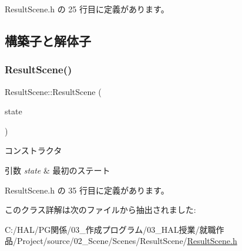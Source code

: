  Result\+Scene.\+h の 25 行目に定義があります。



\subsection{構築子と解体子}
\mbox{\label{class_result_scene_ac184d41a92125eda200a132fe7aadd2e}} 
\subsubsection{\texorpdfstring{Result\+Scene()}{ResultScene()}}
{\footnotesize\ttfamily Result\+Scene\+::\+Result\+Scene (\begin{DoxyParamCaption}\item[{\mbox{\hyperlink{class_scene_base_1_1_state_base}{State\+Base}} $\ast$}]{state }\end{DoxyParamCaption})\hspace{0.3cm}{\ttfamily [inline]}}



コンストラクタ 


\begin{DoxyParams}{引数}
{\em state} & 最初のステート \\
\hline
\end{DoxyParams}


 Result\+Scene.\+h の 35 行目に定義があります。



このクラス詳解は次のファイルから抽出されました\+:\begin{DoxyCompactItemize}
\item 
C\+:/\+H\+A\+L/\+P\+G関係/03\+\_\+作成プログラム/03\+\_\+\+H\+A\+L授業/就職作品/\+Project/source/02\+\_\+\+Scene/\+Scenes/\+Result\+Scene/\mbox{\hyperlink{_result_scene_8h}{Result\+Scene.\+h}}\end{DoxyCompactItemize}
